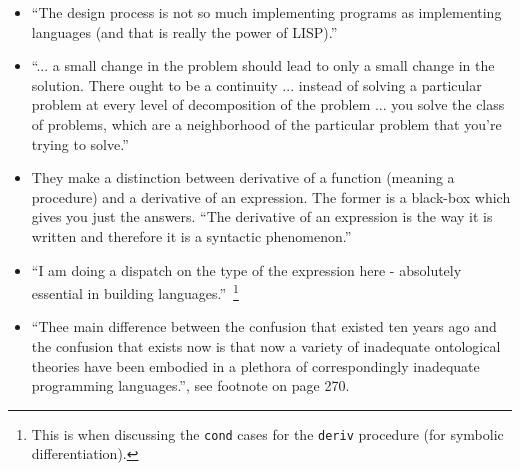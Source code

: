 \documentclass[12pt,a4paper]{article}
\newcommand\cc[1]{\texttt{#1}}
\begin{document}
\begin{itemize}
{  opposed to a strict hierarchy (see end of Lecture 3A).}.
\item ``The design process is not so much implementing programs as implementing
  languages (and that is really the power of LISP).''
\item ``... a small change in the problem should lead to only a small change in the
  solution. There ought to be a continuity ... instead of solving a particular problem
  at every level of decomposition of the problem ... you solve the class of problems,
  which are a neighborhood of the particular problem that you're trying to solve.''
\item They make a distinction between derivative of a function (meaning a procedure) and
  a derivative of an expression. The former is a black-box which gives you just the
  answers. ``The derivative of an expression is the way it is written and therefore it
  is a syntactic phenomenon.''
\item ``I am doing a dispatch on the type of the expression here - absolutely essential
  in building languages.''~\footnote{This is when discussing the \cc{cond} cases for the
  \cc{deriv} procedure (for symbolic differentiation).}
\item ``Thee main difference between the confusion that existed ten years ago and the
  confusion that exists now is that now a variety of inadequate ontological theories
  have been embodied in a plethora of correspondingly inadequate programming
  languages.'', see footnote on page 270.
\end{itemize}

\nocite{*}


\end{document}
